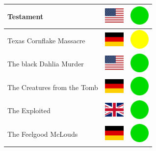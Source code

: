 \documentclass[12pt, a4paper, twoside]{report}
\begin{document}
\begin{center}
\begin{longtable}{|p{5cm}|p{2cm}|p{2cm}|}
 Testament                                                  & \includegraphics[width=1cm]{../4x3/us} &   \includegraphics[width=1cm]{../likes/y} \\ \hline
 Texas Cornflake Massacre                                   & \includegraphics[width=1cm]{../4x3/de} &   \includegraphics[width=1cm]{../likes/m} \\ \hline
 The black Dahlia Murder                                    & \includegraphics[width=1cm]{../4x3/us} &   \includegraphics[width=1cm]{../likes/y} \\ \hline
 The Creatures from the Tomb                                & \includegraphics[width=1cm]{../4x3/de} &   \includegraphics[width=1cm]{../likes/y} \\ \hline
 The Exploited                                              & \includegraphics[width=1cm]{../4x3/gb} &   \includegraphics[width=1cm]{../likes/y} \\ \hline
 The Feelgood McLouds                                       & \includegraphics[width=1cm]{../4x3/de} &   \includegraphics[width=1cm]{../likes/y} \\ \hline

\end{longtable}
\end{center}
\end{document}
